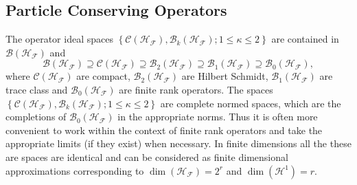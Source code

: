 \documentclass[aps,preprint]{revtex4}%
\begin{document}
\subsection{Particle Conserving Operators}

The operator ideal spaces $\left\{  \mathcal{C}\left(  \mathcal{H}%
_{\mathcal{F}}\right)  ,\mathcal{B}_{k}\left(  \mathcal{H}_{\mathcal{F}%
}\right)  ;1\leq\kappa\leq2\right\}  $ are contained in $\mathcal{B}\left(
\mathcal{H}_{\mathcal{F}}\right)  $ and
\begin{equation}
\mathcal{B}\left(  \mathcal{H}_{\mathcal{F}}\right)  \supseteq\mathcal{C}%
\left(  \mathcal{H}_{\mathcal{F}}\right)  \supseteq\mathcal{B}_{2}\left(
\mathcal{H}_{\mathcal{F}}\right)  \supseteq\mathcal{B}_{1}\left(
\mathcal{H}_{\mathcal{F}}\right)  \supseteq\mathcal{B}_{0}\left(
\mathcal{H}_{\mathcal{F}}\right)  ,
\end{equation}
where $\mathcal{C}\left(  \mathcal{H}_{\mathcal{F}}\right)  $ are compact,
$\mathcal{B}_{2}\left(  \mathcal{H}_{\mathcal{F}}\right)  $ are Hilbert
Schmidt, $\mathcal{B}_{1}\left(  \mathcal{H}_{\mathcal{F}}\right)  $ are trace
class and $\mathcal{B}_{0}\left(  \mathcal{H}_{\mathcal{F}}\right)  $ are
finite rank operators. The spaces $\left\{  \mathcal{C}\left(  \mathcal{H}%
_{\mathcal{F}}\right)  ,\mathcal{B}_{k}\left(  \mathcal{H}_{\mathcal{F}%
}\right)  ;1\leq\kappa\leq2\right\}  $ are complete normed spaces, which are
the completions of $\mathcal{B}_{0}\left(  \mathcal{H}_{\mathcal{F}}\right)  $
in the appropriate norms. Thus it is often more convenient to work within the
context of finite rank operators and take the appropriate limits (if they
exist) when necessary. In finite dimensions all the these are spaces are
identical and can be considered as finite dimensional approximations
corresponding to $\dim\left(  \mathcal{H}_{\mathcal{F}}\right)  =2^{r}$ and
$\dim\left(  \mathcal{H}^{1}\right)  =r$.
\end{document}
